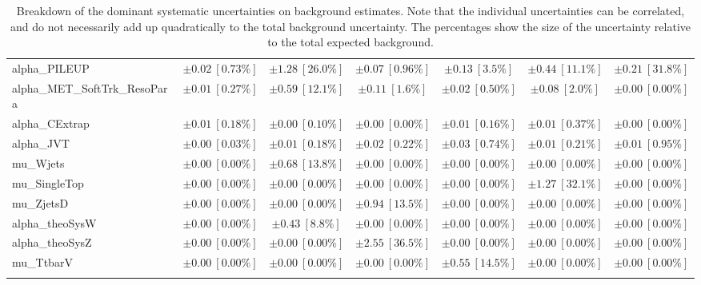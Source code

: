 \begin{sidewaystable}
\begin{center}
\begin{tabular*}{\textwidth}{@{\extracolsep{\fill}}lcccccc}
alpha\_PILEUP         & $\pm 0.02\ [0.73\%] $          & $\pm 1.28\ [26.0\%] $          & $\pm 0.07\ [0.96\%] $          & $\pm 0.13\ [3.5\%] $          & $\pm 0.44\ [11.1\%] $          & $\pm 0.21\ [31.8\%] $       \\
alpha\_MET\_SoftTrk\_ResoPara         & $\pm 0.01\ [0.27\%] $          & $\pm 0.59\ [12.1\%] $          & $\pm 0.11\ [1.6\%] $          & $\pm 0.02\ [0.50\%] $          & $\pm 0.08\ [2.0\%] $          & $\pm 0.00\ [0.00\%] $       \\
alpha\_CExtrap         & $\pm 0.01\ [0.18\%] $          & $\pm 0.00\ [0.10\%] $          & $\pm 0.00\ [0.00\%] $          & $\pm 0.01\ [0.16\%] $          & $\pm 0.01\ [0.37\%] $          & $\pm 0.00\ [0.00\%] $       \\
alpha\_JVT         & $\pm 0.00\ [0.03\%] $          & $\pm 0.01\ [0.18\%] $          & $\pm 0.02\ [0.22\%] $          & $\pm 0.03\ [0.74\%] $          & $\pm 0.01\ [0.21\%] $          & $\pm 0.01\ [0.95\%] $       \\
mu\_Wjets         & $\pm 0.00\ [0.00\%] $          & $\pm 0.68\ [13.8\%] $          & $\pm 0.00\ [0.00\%] $          & $\pm 0.00\ [0.00\%] $          & $\pm 0.00\ [0.00\%] $          & $\pm 0.00\ [0.00\%] $       \\
mu\_SingleTop         & $\pm 0.00\ [0.00\%] $          & $\pm 0.00\ [0.00\%] $          & $\pm 0.00\ [0.00\%] $          & $\pm 0.00\ [0.00\%] $          & $\pm 1.27\ [32.1\%] $          & $\pm 0.00\ [0.00\%] $       \\
mu\_ZjetsD         & $\pm 0.00\ [0.00\%] $          & $\pm 0.00\ [0.00\%] $          & $\pm 0.94\ [13.5\%] $          & $\pm 0.00\ [0.00\%] $          & $\pm 0.00\ [0.00\%] $          & $\pm 0.00\ [0.00\%] $       \\
alpha\_theoSysW         & $\pm 0.00\ [0.00\%] $          & $\pm 0.43\ [8.8\%] $          & $\pm 0.00\ [0.00\%] $          & $\pm 0.00\ [0.00\%] $          & $\pm 0.00\ [0.00\%] $          & $\pm 0.00\ [0.00\%] $       \\
alpha\_theoSysZ         & $\pm 0.00\ [0.00\%] $          & $\pm 0.00\ [0.00\%] $          & $\pm 2.55\ [36.5\%] $          & $\pm 0.00\ [0.00\%] $          & $\pm 0.00\ [0.00\%] $          & $\pm 0.00\ [0.00\%] $       \\
mu\_TtbarV         & $\pm 0.00\ [0.00\%] $          & $\pm 0.00\ [0.00\%] $          & $\pm 0.00\ [0.00\%] $          & $\pm 0.55\ [14.5\%] $          & $\pm 0.00\ [0.00\%] $          & $\pm 0.00\ [0.00\%] $       \\
\noalign{\smallskip}\hline\noalign{\smallskip}
\end{tabular*}
\end{center}
\caption[Breakdown of uncertainty on background estimates]{
Breakdown of the dominant systematic uncertainties on background estimates.
Note that the individual uncertainties can be correlated, and do not necessarily add up quadratically to 
the total background uncertainty. The percentages show the size of the uncertainty relative to the total expected background.
\label{table.results.bkgestimate.uncertainties.SRD_low_bybkg}}
\end{sidewaystable}
%
